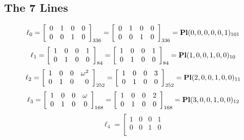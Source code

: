 \documentclass{article}
\begin{document}
{\subsection*{The 7 Lines}
$$
\ell_{0} = 
\left[
\begin{array}{*{4}{r}}
0 & 1 & 0 & 0\\
0 & 0 & 1 & 0\\
\end{array}
\right]
_{336}
=
\left[
\begin{array}{*{4}c}
0  & 1  & 0  & 0\\
0  & 0  & 1  & 0\\
\end{array}
\right]_{336}
={\rm\bf Pl}(0,0,0,0,0,1 )_{101}$$
$$
\ell_{1} = 
\left[
\begin{array}{*{4}{r}}
1 & 0 & 0 & 1\\
0 & 1 & 0 & 0\\
\end{array}
\right]
_{84}
=
\left[
\begin{array}{*{4}c}
1  & 0  & 0  & 1\\
0  & 1  & 0  & 0\\
\end{array}
\right]_{84}
={\rm\bf Pl}(1,0,0,1,0,0 )_{10}$$
$$
\ell_{2} = 
\left[
\begin{array}{*{4}{r}}
1 & 0 & 0 & \omega^{2}\\
0 & 1 & 0 & 0\\
\end{array}
\right]
_{252}
=
\left[
\begin{array}{*{4}c}
1  & 0  & 0  & 3\\
0  & 1  & 0  & 0\\
\end{array}
\right]_{252}
={\rm\bf Pl}(2,0,0,1,0,0 )_{11}$$
$$
\ell_{3} = 
\left[
\begin{array}{*{4}{r}}
1 & 0 & 0 & \omega \\
0 & 1 & 0 & 0\\
\end{array}
\right]
_{168}
=
\left[
\begin{array}{*{4}c}
1  & 0  & 0  & 2\\
0  & 1  & 0  & 0\\
\end{array}
\right]_{168}
={\rm\bf Pl}(3,0,0,1,0,0 )_{12}$$
$$
\ell_{4} = 
\left[
\begin{array}{*{4}{r}}
1 & 0 & 0 & 1\\
0 & 0 & 1 & 0\\

\end{array}$$}
\end{document}
